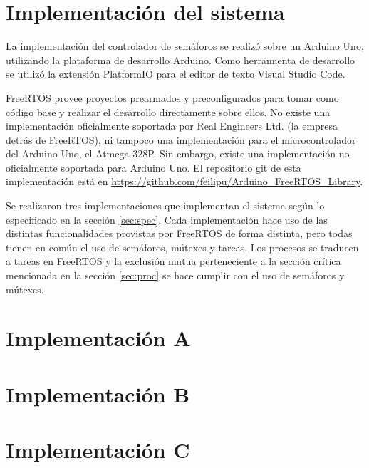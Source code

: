 \section{Implementación del sistema}
La implementación del controlador de semáforos se realizó sobre un Arduino Uno, utilizando la plataforma de desarrollo Arduino. Como herramienta de desarrollo se utilizó la extensión PlatformIO para el editor de texto Visual Studio Code.

FreeRTOS provee proyectos prearmados y preconfigurados para tomar como código base y realizar el desarrollo directamente sobre ellos. No existe una implementación oficialmente soportada por Real Engineers Ltd. (la empresa detrás de FreeRTOS), ni tampoco una implementación para el microcontrolador del Arduino Uno, el Atmega 328P. Sin embargo, existe una implementación no oficialmente soportada para Arduino Uno. El repositorio git de esta implementación está en \url{https://github.com/feilipu/Arduino\_FreeRTOS\_Library}.

Se realizaron tres implementaciones que implementan el sistema según lo especificado en la sección \ref{sec:spec}. Cada implementación hace uso de las distintas funcionalidades provistas por FreeRTOS de forma distinta, pero todas tienen en común el uso de semáforos, mútexes y tareas. Los procesos se traducen a tareas en FreeRTOS y la exclusión mutua perteneciente a la sección crítica mencionada en la sección \ref{sec:proc} se hace cumplir con el uso de semáforos y mútexes.

\section{Implementación A}
\section{Implementación B}
\section{Implementación C}
